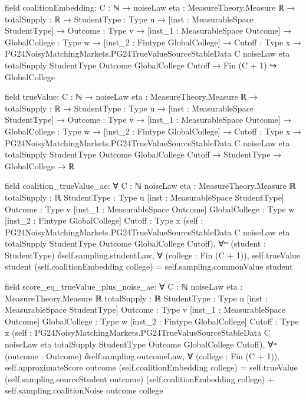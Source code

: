 \documentclass[10pt]{article}
\begin{document}
\begin{ReviewVerbatim}
field coalitionEmbedding:
{C : ℕ} →
  {noiseLaw eta : MeasureTheory.Measure ℝ} →
    {totalSupply : ℝ} →
      {StudentType : Type u} →
        [inst : MeasurableSpace StudentType] →
          {Outcome : Type v} →
            [inst_1 : MeasurableSpace Outcome] →
              {GlobalCollege : Type w} →
                [inst_2 : Fintype GlobalCollege] →
                  {Cutoff : Type x} →
                    PG24NoisyMatchingMarkets.PG24TrueValueSourceStableData C noiseLaw eta totalSupply StudentType
                        Outcome GlobalCollege Cutoff →
                      Fin (C + 1) ↪ GlobalCollege

field trueValue:
{C : ℕ} →
  {noiseLaw eta : MeasureTheory.Measure ℝ} →
    {totalSupply : ℝ} →
      {StudentType : Type u} →
        [inst : MeasurableSpace StudentType] →
          {Outcome : Type v} →
            [inst_1 : MeasurableSpace Outcome] →
              {GlobalCollege : Type w} →
                [inst_2 : Fintype GlobalCollege] →
                  {Cutoff : Type x} →
                    PG24NoisyMatchingMarkets.PG24TrueValueSourceStableData C noiseLaw eta totalSupply StudentType
                        Outcome GlobalCollege Cutoff →
                      StudentType → GlobalCollege → ℝ

field coalition_trueValue_ae:
∀ {C : ℕ} {noiseLaw eta : MeasureTheory.Measure ℝ} {totalSupply : ℝ} {StudentType : Type u}
  [inst : MeasurableSpace StudentType] {Outcome : Type v} [inst_1 : MeasurableSpace Outcome] {GlobalCollege : Type w}
  [inst_2 : Fintype GlobalCollege] {Cutoff : Type x}
  (self :
    PG24NoisyMatchingMarkets.PG24TrueValueSourceStableData C noiseLaw eta totalSupply StudentType Outcome GlobalCollege
      Cutoff),
  ∀ᵐ (student : StudentType) ∂self.sampling.studentLaw,
    ∀ (college : Fin (C + 1)),
      self.trueValue student (self.coalitionEmbedding college) = self.sampling.commonValue student

field score_eq_trueValue_plus_noise_ae:
∀ {C : ℕ} {noiseLaw eta : MeasureTheory.Measure ℝ} {totalSupply : ℝ} {StudentType : Type u}
  [inst : MeasurableSpace StudentType] {Outcome : Type v} [inst_1 : MeasurableSpace Outcome] {GlobalCollege : Type w}
  [inst_2 : Fintype GlobalCollege] {Cutoff : Type x}
  (self :
    PG24NoisyMatchingMarkets.PG24TrueValueSourceStableData C noiseLaw eta totalSupply StudentType Outcome GlobalCollege
      Cutoff),
  ∀ᵐ (outcome : Outcome) ∂self.sampling.outcomeLaw,
    ∀ (college : Fin (C + 1)),
      self.approximateScore outcome (self.coalitionEmbedding college) =
        self.trueValue (self.sampling.sourceStudent outcome) (self.coalitionEmbedding college) +
          self.sampling.coalitionNoise outcome college
\end{ReviewVerbatim}
\end{document}
